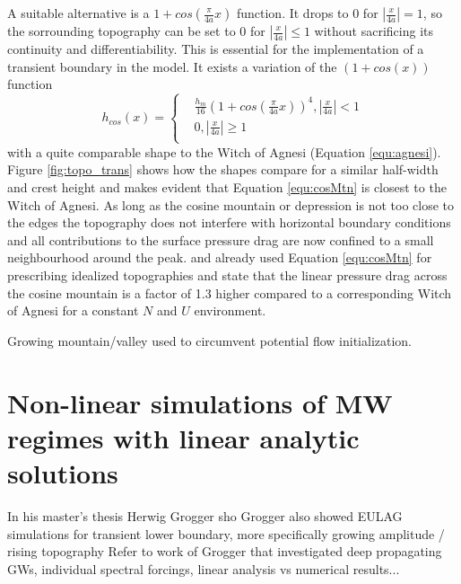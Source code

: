 A suitable alternative is a $1+cos(\frac{\pi}{4a}x)$ function. It drops to 0 for $|\frac{x}{4a}| = 1$, so the sorrounding topography can be set to 0 for $|\frac{x}{4a}| \leq 1$ without sacrificing its continuity and differentiability. This is essential for the implementation of a transient boundary in the model. It exists a variation of the $(1+cos(x))$ function  
\begin{equation}
    h_{cos}(x) = 
    \begin{cases}
        & \frac{h_m}{16} (1+cos(\frac{\pi}{4a}x))^4, |\frac{x}{4a}| < 1 \\
        & 0, |\frac{x}{4a}| \geq 1 \\
      \end{cases}
    \label{equ:cosMtn}
\end{equation}
with a quite comparable shape to the Witch of Agnesi (Equation \ref{equ:agnesi}). Figure \ref{fig:topo_trans} shows how the shapes compare for a similar half-width and crest height and makes evident that Equation \ref{equ:cosMtn} is closest to the Witch of Agnesi. As long as the cosine mountain or depression is not too close to the edges the topography does not interfere with horizontal boundary conditions and all contributions to the surface pressure drag are now confined to a small neighbourhood around the peak. \textcite[]{epifanio_three-dimensional_2001} and \textcite{metz_are_2021} already used Equation \ref{equ:cosMtn} for prescribing idealized topographies and \textcite{metz_are_2021} state that the linear pressure drag across the cosine mountain is a factor of 1.3 higher compared to a corresponding Witch of Agnesi for a constant $N$ and $U$ environment.

Growing mountain/valley used to circumvent potential flow initialization.


\section{Non-linear simulations of MW regimes with linear analytic solutions}
\label{sec:linear-MWs}

In his master's thesis Herwig Grogger sho
Grogger also showed EULAG simulations for transient lower boundary, more specifically growing amplitude / rising topography 
Refer to work of Grogger that investigated deep propagating GWs, individual spectral forcings, linear analysis vs numerical results...


